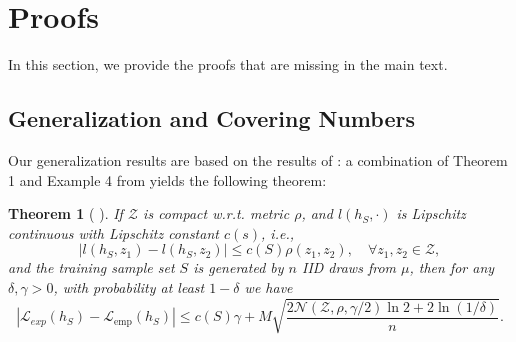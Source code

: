 \documentclass{article}
\theoremstyle{definition}
\theoremstyle{plain}
\newtheorem{theorem}[definition]{Theorem}
\newcommand{\Lemp}{\mathcal{L}_{\mathrm{emp}}}
\begin{document}
\section{Proofs}
In this section, we provide the proofs that are missing in the main text. 


\subsection{Generalization and Covering Numbers}\label{app:gen}
Our generalization results are based on the results of \cite{xu_robustness_2012}: a combination of Theorem 1 and Example 4 from  \cite{xu_robustness_2012} yields the following theorem:  
\begin{theorem}[ \cite{xu_robustness_2012}]\label{thm:xu}
If $\mathcal{Z}$ is compact w.r.t. metric $\rho$, and $l(h_S, \cdot)$ is Lipschitz continuous with Lipschitz constant $c(s)$, i.e.,
\begin{equation*}
|l(h_S, z_1) - l(h_S, z_2)| \le c(S) \rho(z_1, z_2), \quad \forall z_1, z_2 \in \mathcal{Z},
\end{equation*}
 and the training sample set $S$ is generated by $n$ IID draws from $\mu$, then for any $\delta,\gamma > 0$, with probability at least $1 - \delta$ we have
\begin{equation}\label{eq:intermediate}
|\mathcal{L}_{exp}(h_S) - \Lemp(h_S)| \le c(S)\gamma + M \sqrt{\frac{2\mathcal{N}( \mathcal{Z}, \rho,\gamma/2) \ln 2 + 2 \ln(1/\delta)}{n}}.
\end{equation}
\end{theorem}
\end{document}
